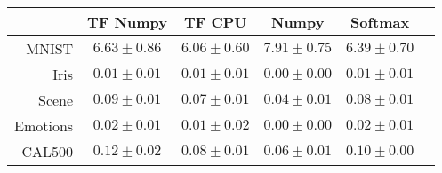 \begin{tabular}{r|ccccc}
& TF Numpy & TF CPU & Numpy & Softmax \\
\hline
MNIST & $6.63 \pm 0.86$ & $6.06 \pm 0.60$ & $7.91 \pm 0.75$ & $6.39 \pm 0.70$ \\
Iris & $0.01 \pm 0.01$ & $0.01 \pm 0.01$ & $0.00 \pm 0.00$ & $0.01 \pm 0.01$ \\
Scene & $0.09 \pm 0.01$ & $0.07 \pm 0.01$ & $0.04 \pm 0.01$ & $0.08 \pm 0.01$ \\
Emotions & $0.02 \pm 0.01$ & $0.01 \pm 0.02$ & $0.00 \pm 0.00$ & $0.02 \pm 0.01$ \\
CAL500 & $0.12 \pm 0.02$ & $0.08 \pm 0.01$ & $0.06 \pm 0.01$ & $0.10 \pm 0.00$ \\
\end{tabular}
